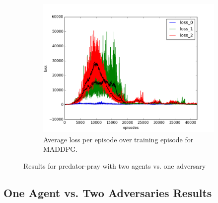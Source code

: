 \begin{figure}[h]
\begin{subfigure}[h]{\figscale\linewidth}
    \includegraphics[trim=10 10 10 10,clip,width=\linewidth]
    {../results/maddpg_1vs2/loss.png}
    \caption{Average loss per episode over training episode for MADDPG.}
    \label{fig:maddpg-1vs2-loss}
  \end{subfigure}


  \caption{Results for predator-pray with two agents vs. one adversary}
  \label{fig:1vs2}
\end{figure}
\FloatBarrier


\subsection{One Agent vs. Two Adversaries Results}
\label{sec:experiment:2vs1}


